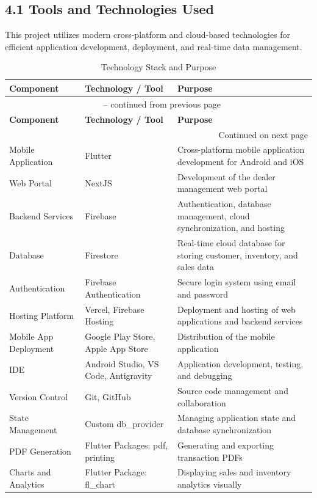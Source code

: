 \documentclass[12pt, oneside]{article}
\begin{document}
\subsection*{4.1 Tools and Technologies Used}
This project utilizes modern cross-platform and cloud-based technologies for efficient application development, deployment, and real-time data management.
\renewcommand{\arraystretch}{1.4}
\begin{longtable}{|p{4cm}|p{5cm}|p{5cm}|}
\caption{Technology Stack and Purpose} \label{tab:tech-stack} \\
\hline
\textbf{Component} & \textbf{Technology / Tool} & \textbf{Purpose} \\
\hline
\endfirsthead
\multicolumn{3}{c}{{\tablename\ \thetable{} -- continued from previous page}} \\
\hline
\textbf{Component} & \textbf{Technology / Tool} & \textbf{Purpose} \\
\hline
\endhead
\hline \multicolumn{3}{|r|}{{Continued on next page}} \\ \hline
\endfoot
\hline
\endlastfoot
Mobile Application & Flutter & Cross-platform mobile application development for Android and iOS \\
\hline
Web Portal & NextJS & Development of the dealer management web portal \\
\hline
Backend Services & Firebase & Authentication, database management, cloud synchronization, and hosting \\
\hline
Database & Firestore & Real-time cloud database for storing customer, inventory, and sales data \\
\hline
Authentication & Firebase Authentication & Secure login system using email and password \\
\hline
Hosting Platform & Vercel, Firebase Hosting & Deployment and hosting of web applications and backend services \\
\hline
Mobile App Deployment & Google Play Store, Apple App Store & Distribution of the mobile application \\
\hline
IDE & Android Studio, VS Code, Antigravity & Application development, testing, and debugging \\
\hline
Version Control & Git, GitHub & Source code management and collaboration \\
\hline
State Management & Custom db\_provider & Managing application state and database synchronization \\
\hline
PDF Generation & Flutter Packages: pdf, printing & Generating and exporting transaction PDFs \\
\hline
Charts and Analytics & Flutter Package: fl\_chart & Displaying sales and inventory analytics visually \\
\hline
\end{longtable}
\end{document}
